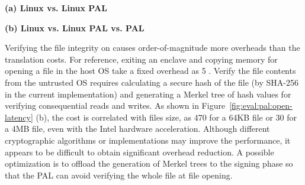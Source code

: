 \begin{figure*}[t!]
\centering
\footnotesize
{}
\parbox{0.49\textwidth}{\centering\bf (a) Linux vs. Linux PAL}
\parbox{0.49\textwidth}{\centering\bf (b) Linux vs. Linux PAL vs. \sgx{} PAL}
\caption{Latency of  on the Linux PAL  and \sgx{} PAL, versus  on Linux.
Lower is better.
Figure (a) compares  on the Linux PAL,
with and without a \seccomp{} filter ({\bf +SC})
and reference monitor ({\bf +RM}), against  on Linux. Figure (b) compares  on a \sgx{} PAL,
with and without integrity checks ({\bf +CHK}),
against the Linux PAL and  on Linux.}
\label{fig:eval:pal:open-latency}
\end{figure*}


Verifying the file integrity on \sgx{}
causes order-of-magnitude more overheads than the translation costs.
For reference,
exiting an enclave and copying memory for opening a file in the host OS take a fixed overhead
as \roughly{}5 \usec{}.
Verify the file contents from the untrusted OS
requires
calculating a secure hash of the file (by SHA-256 in the current implementation)
and generating a Merkel tree of hash values
for verifying
consequential reads and writes.
As shown in Figure~\ref{fig:eval:pal:open-latency} (b),
the cost is correlated with files size,
as \roughly{}470\usec{} for a 64KB file or \roughly{}30 \msec{} for a 4MB file,
even with the Intel hardware acceleration.
Although different cryptographic algorithms or implementations
may improve the performance,
it appears to be difficult to obtain significant overhead reduction.
A possible optimization
is to offload the generation of Merkel trees to the signing phase so that the PAL can avoid verifying the whole file at file opening.






